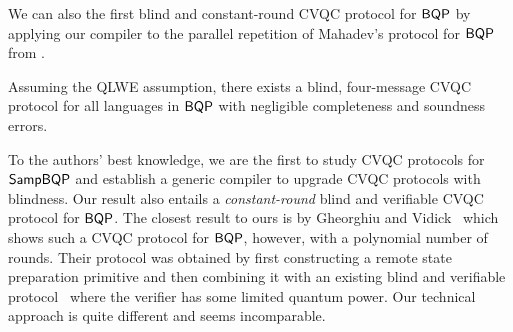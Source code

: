 We can also the first blind and constant-round CVQC protocol for $\operatorname{\mathsf{BQP}}$ by applying our compiler to the parallel repetition of Mahadev's protocol for $\operatorname{\mathsf{BQP}}$ from \cite{parallelrep, alagic2019twomessage}.


\begin{theorem}[informal]
    Assuming the QLWE assumption, there exists a blind, four-message CVQC protocol for all languages in $\operatorname{\mathsf{BQP}}$ with negligible completeness and soundness errors.
\end{theorem}




To the authors' best knowledge, we are the first to study CVQC protocols for $\operatorname{\mathsf{SampBQP}}$ and establish a generic compiler to upgrade CVQC protocols with blindness.
Our result also entails a \emph{constant-round} blind and verifiable CVQC protocol for $\operatorname{\mathsf{BQP}}$.
The closest result to ours is by Gheorghiu and Vidick~\cite{FOCS:GheVid19} which shows such a CVQC protocol for $\operatorname{\mathsf{BQP}}$, however, with a polynomial number of rounds.
Their protocol was obtained by first constructing a remote state preparation primitive and then combining it with an existing blind and verifiable protocol~\cite{FK17} where the verifier has some limited quantum power.
Our technical approach is quite different and seems incomparable.


